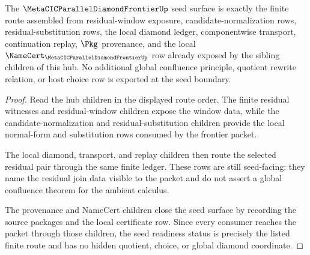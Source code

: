 \begin{theorem}
\label{thm:metacic-parallel-diamond-frontier-seed-readiness-status}
The $\MetaCICParallelDiamondFrontierUp$ seed surface is exactly the finite route assembled from residual-window exposure, candidate-normalization rows, residual-substitution rows, the local diamond ledger, componentwise transport, continuation replay, $\Pkg$ provenance, and the local $\NameCert_{\MetaCICParallelDiamondFrontierUp}$ row already exposed by the sibling children of this hub. No additional global confluence principle, quotient rewrite relation, or host choice row is exported at the seed boundary.
\end{theorem}
\begin{proof}
Read the hub children in the displayed route order. The finite residual witnesses and residual-window children expose the window data, while the candidate-normalization and residual-substitution children provide the local normal-form and substitution rows consumed by the frontier packet.

The local diamond, transport, and replay children then route the selected residual pair through the same finite ledger. These rows are still seed-facing: they name the residual join data visible to the packet and do not assert a global confluence theorem for the ambient calculus.

The provenance and NameCert children close the seed surface by recording the source packages and the local certificate row. Since every consumer reaches the packet through those children, the seed readiness status is precisely the listed finite route and has no hidden quotient, choice, or global diamond coordinate.
\end{proof}
